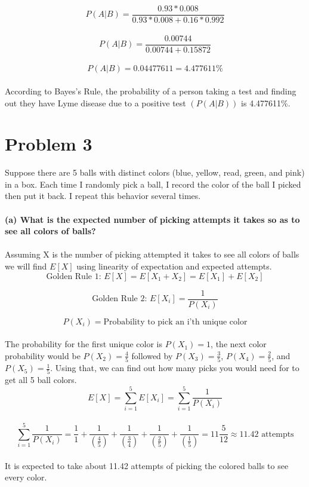 \documentclass[titlepage]{article}
\begin{document}
\[ P(A|B) = \frac{0.93*0.008}{0.93*0.008+0.16*0.992}\]
\\
\[ P(A|B) = \frac{0.00744}{0.00744+0.15872}\]
\\
\[ P(A|B) = 0.04477611 = 4.477611\%\]
\\
According to Bayes's Rule, the probability of a person taking a test and finding out they have Lyme disease due to a positive test $(P(A|B))$ is 4.477611\%.

\section*{Problem 3}
Suppose there are 5 balls with distinct colors (blue, yellow, read, green, and pink) in a box. Each time I randomly pick a ball, I record the color of the ball I picked then put it back. I repeat this behavior several times.\\
\\
\textbf{(a) What is the expected number of picking attempts it takes so as to see all colors of balls?}\\
\\
Assuming X is the number of picking attempted it takes to see all colors of balls we will find $E[X]$ using linearity of expectation and expected attempts.\\

\[\text{Golden Rule 1: } E[X] = E[X_1+X_2] = E[X_1] + E[X_2]\]

\[\text{Golden Rule 2: } E[X_i] = \frac{1}{P(X_i)}\]

\[P(X_i) = \text{Probability to pick an i'th unique color}\]\\
The probability for the first unique color is $P(X_1)=1$, the next color probability would be $P(X_2) = \frac{4}{5}$ followed by $P(X_3) = \frac{3}{5}$, $ P(X_4)=\frac{2}{5}$, and $P(X_5)=\frac{1}{5}$. Using that, we can find out how many picks you would need for to get all 5 ball colors.\\

\[E[X] = \sum_{i=1}^{5}E[X_i]=\sum_{i=1}^{5}\frac{1}{P(X_i)}\]\\
\[\sum_{i=1}^{5}\frac{1}{P(X_i)} = \frac{1}{1}+\frac{1}{(\frac{4}{5})}+\frac{1}{(\frac{3}{4})}+\frac{1}{(\frac{2}{5})}+\frac{1}{(\frac{1}{5})}=11\frac{5}{12} \approx 11.42\text{ attempts}\] \\

It is expected to take about 11.42 attempts of picking the colored balls to see every color.\\
\end{document}
